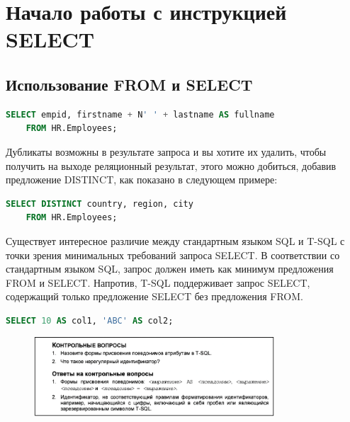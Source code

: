\chapter{Начало работы с инструкцией SELECT}
\section{Использование FROM и SELECT}

\begin{lstlisting}[label=lst:funcReturn, caption=Пример работы, language=sql]
	SELECT empid, firstname + N' ' + lastname AS fullname
	FROM HR.Employees; 
\end{lstlisting}

Дубликаты возможны в результате запроса и вы хотите их удалить, чтобы получить на выходе
реляционный результат, этого можно добиться, добавив предложение DISTINCT, как
показано в следующем примере: 

\begin{lstlisting}[label=lst:funcReturn, caption=Пример работы DISTINCT, language=sql]
	SELECT DISTINCT country, region, city
	FROM HR.Employees; 
\end{lstlisting}


Существует интересное различие между стандартным языком SQL и T-SQL с точки
зрения минимальных требований запроса SELECT. В соответствии со стандартным
языком SQL, запрос должен иметь как минимум предложения FROM и SELECT. Напротив, T-SQL поддерживает запрос SELECT, содержащий только предложение SELECT
без предложения FROM. 


\begin{lstlisting}[label=lst:funcReturn, language=sql]
	SELECT 10 AS col1, 'ABC' AS col2; 
\end{lstlisting}	


\begin{figure}[h!]
	\begin{center}
		\includegraphics[width=0.8\textwidth]{img/control6.png}
	\end{center}
	\captionsetup{justification=centering}
\end{figure}


